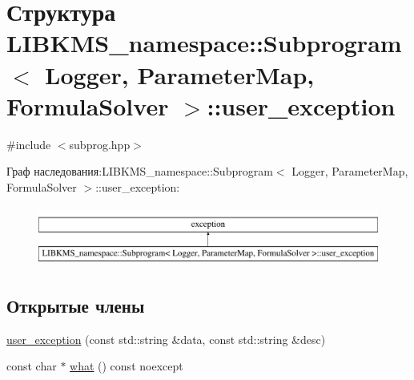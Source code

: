 \hypertarget{structLIBKMS__namespace_1_1Subprogram_1_1user__exception}{\section{Структура L\-I\-B\-K\-M\-S\-\_\-namespace\-:\-:Subprogram$<$ Logger, Parameter\-Map, Formula\-Solver $>$\-:\-:user\-\_\-exception}
\label{structLIBKMS__namespace_1_1Subprogram_1_1user__exception}
}


{\ttfamily \#include $<$subprog.\-hpp$>$}

Граф наследования\-:L\-I\-B\-K\-M\-S\-\_\-namespace\-:\-:Subprogram$<$ Logger, Parameter\-Map, Formula\-Solver $>$\-:\-:user\-\_\-exception\-:\begin{figure}[H]
\begin{center}
\leavevmode
\includegraphics[height=2.000000cm]{structLIBKMS__namespace_1_1Subprogram_1_1user__exception}
\end{center}
\end{figure}
\subsection*{Открытые члены}
\begin{DoxyCompactItemize}
\item 
\hyperlink{structLIBKMS__namespace_1_1Subprogram_1_1user__exception_ae95b23bd4a15dfcd4d465523ccb3fee3}{user\-\_\-exception} (const std\-::string \&data, const std\-::string \&desc)
\item 
const char $\ast$ \hyperlink{structLIBKMS__namespace_1_1Subprogram_1_1user__exception_a3ba2886c83dd09d8b75da56c1145f76b}{what} () const noexcept
\end{DoxyCompactItemize}


